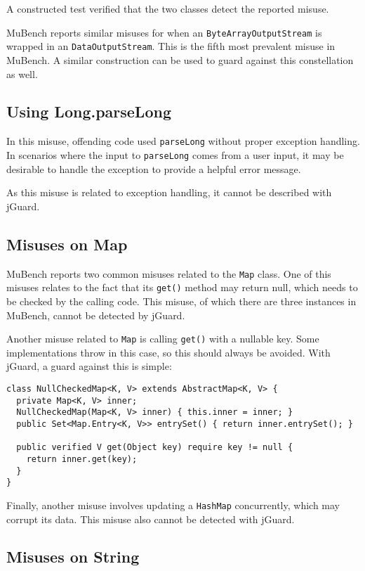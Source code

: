 \documentclass{article}
\begin{document}
A constructed test verified that the two classes detect the reported
misuse.

MuBench reports similar misuses for when an \texttt{ByteArrayOutputStream}
is wrapped in an \texttt{Data\-Output\-Stream}.
This is the fifth most prevalent misuse in MuBench.
A similar construction can be used to guard against this constellation as well.

\subsection{Using Long.parseLong}

In this misuse, offending code used \texttt{parseLong} without proper exception handling.
In scenarios where the input to \texttt{parseLong} comes from a user input,
it may be desirable to handle the exception to provide a helpful error message.

As this misuse is related to exception handling, it cannot be described with jGuard.

\subsection{Misuses on Map}

MuBench reports two common misuses related to the \texttt{Map} class.
One of this misuses relates to the fact that its \texttt{get()} method may return
null, which needs to be checked by the calling code.
This misuse, of which there are three instances in MuBench, cannot be detected
by jGuard.

Another misuse related to \texttt{Map} is calling \texttt{get()} with a nullable
key. Some implementations throw in this case, so this should always be avoided.
With jGuard, a guard against this is simple:

\begin{lstlisting}[style=jGuard]
class NullCheckedMap<K, V> extends AbstractMap<K, V> {
  private Map<K, V> inner;
  NullCheckedMap(Map<K, V> inner) { this.inner = inner; }
  public Set<Map.Entry<K, V>> entrySet() { return inner.entrySet(); }

  public verified V get(Object key) require key != null {
    return inner.get(key);
  }
}
\end{lstlisting}

Finally, another misuse involves updating a \texttt{HashMap} concurrently,
which may corrupt its data.
This misuse also cannot be detected with jGuard.

\subsection{Misuses on String}
\end{document}
